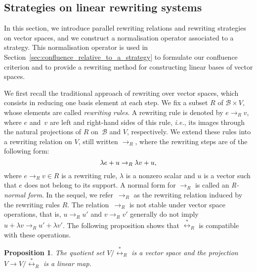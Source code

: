 \documentclass[11pt]{article}
\newtheorem{proposition}[theorem]{Proposition}
\theoremstyle{definition}
\newcommand\ie{\emph{i.e.}}
\newcommand\basis{\mathscr{B}}
\newcommand\rewR{\to_R}
\newcommand\equivR{\overset{*}{\leftrightarrow}_R}
\begin{document}
\subsection{Strategies on linear rewriting systems}
\label{sec:strategies_on_linear_rewriting_systems}

In this section, we introduce parallel rewriting relations and rewriting
strategies on vector spaces, and we construct a normalisation operator
associated to a strategy. This normalisation operator is used in
Section~\ref{sec:confluence_relative_to_a_strategy} to formulate our
confluence criterion and to provide a rewriting method for constructing
linear bases of vector spaces. 
\medskip

We first recall the traditional approach of rewriting over vector spaces,
which consists in reducing one basis element at each step. We fix a
subset $R$ of $\basis\times V$, whose elements are called
{\em rewriting rules}. A rewriting rule is denoted by $e\rewR v$, where
$e$ and~$v$ are left and right-hand sides of this rule, \ie, its images
through the natural projections of $R$  on~$\basis$ and $V$,
respectively. We extend these rules into a rewriting relation on $V$,
still written $\rewR$, where the rewriting steps are of the following
form: 
\begin{equation}\label{equ:R_rewriting_step}
  \lambda e+u\rewR\lambda v+u,
  \smallskip
\end{equation}
where $e\rewR v\in R$ is a rewriting rule, $\lambda$ is a nonzero scalar
and $u$ is a vector such that $e$ does not belong to its support. A
normal form for $\rewR$ is called an {\em R-normal form}. In the sequel, 
we refer~$\rewR$ as the rewriting relation induced by the rewriting rules
$R$. The relation~$\rewR$ is not stable under vector space
operations, that is, $u\rewR u'$ and $v\rewR v'$ generally do not imply 
$u+\lambda v\rewR u'+\lambda v'$. The following proposition shows that
$\equivR$ is compatible with these operations.
\smallskip

\begin{proposition}\label{prop:vs_structure}
  The quotient set $V/\equivR$ is a vector space and the projection
  $V\to V/\equivR$ is a linear map.
\end{proposition}
\end{document}
